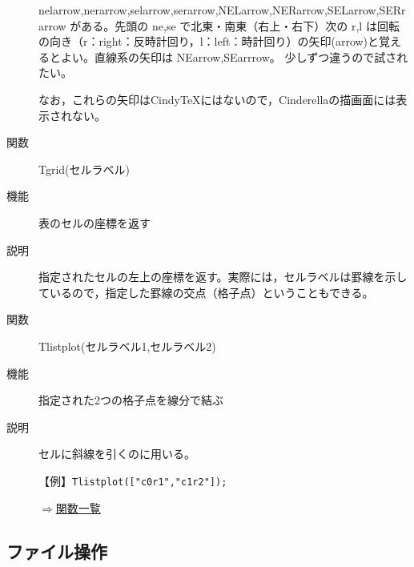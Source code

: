 \documentclass[papersize,a4paper,10pt,uplatex]{jsarticle}
\begin{document}
\begin{description}
nelarrow,nerarrow,selarrow,serarrow,NELarrow,NERarrow,SELarrow,SERrarrow がある。先頭の ne,se で北東・南東（右上・右下）次の r,l は回転の向き（r：right：反時計回り，l：left：時計回り）の矢印(arrow)と覚えるとよい。直線系の矢印は NEarrow,SEarrrow。 少しずつ違うので試されたい。

なお，これらの矢印はCindyTeXにはないので，Cinderellaの描画面には表示されない。


\vspace{\baselineskip}
\hypertarget{tgrid}{}
\item[関数]Tgrid(セルラベル)
\item[機能]表のセルの座標を返す
\item[説明]指定されたセルの左上の座標を返す。実際には，セルラベルは罫線を示しているので，指定した罫線の交点（格子点）ということもできる。

\vspace{\baselineskip}
\hypertarget{tlistplot}{}
\item[関数]Tlistplot(セルラベル1,セルラベル2)
\item[機能]指定された2つの格子点を線分で結ぶ
\item[説明]セルに斜線を引くのに用いる。

\vspace{\baselineskip}
【例】\verb|Tlistplot(["c0r1","c1r2"]);| 

\vspace{\baselineskip}
\begin{flushright}\hyperlink{functionlist}{$\Rightarrow$関数一覧}\end{flushright}

\end{description}

\subsection{ファイル操作}

\hypertarget{filemanip}{}
\end{document}
